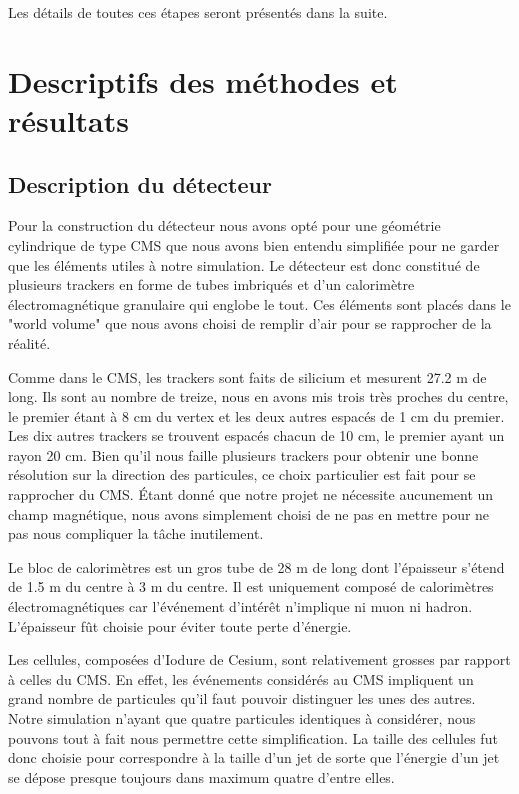 \documentclass[11pt]{article}
\begin{document}
Les d\'etails de toutes ces \'etapes seront pr\'esent\'es dans la suite.





		    \section{Descriptifs des méthodes et résultats}

\subsection{Description du détecteur}

Pour la construction du détecteur nous avons opté pour une géométrie cylindrique
de type CMS que nous avons bien entendu simplifiée pour ne garder que les
éléments utiles à notre simulation. Le détecteur est donc constitué de plusieurs
trackers en forme de tubes imbriqués et d'un calorimètre
électromagnétique granulaire qui englobe le tout. Ces éléments sont placés dans
le "world volume" que nous avons choisi de remplir d'air pour se rapprocher de
la réalité.

Comme dans le CMS, les trackers sont faits de silicium et mesurent 27.2 m de
long. Ils sont au nombre de treize, nous en avons mis trois très proches du
centre, le premier étant à 8 cm du vertex et les deux autres espacés de 1 cm du
premier. Les dix autres trackers se trouvent espacés chacun de 10 cm, le premier
ayant un rayon 20 cm. Bien qu'il nous faille plusieurs trackers pour obtenir
une bonne résolution sur la direction des particules, ce choix particulier est
fait pour se rapprocher du CMS. Étant donné que notre projet ne nécessite
aucunement un champ magnétique, nous avons simplement choisi de ne pas en
mettre pour ne pas nous compliquer la tâche inutilement. 

Le bloc de calorimètres est un gros tube de 28 m de long dont
l'épaisseur s'étend de 1.5 m du centre à 3 m du centre. Il est uniquement
composé de calorimètres électromagnétiques car l'événement d'intérêt n'implique
ni muon ni hadron. L'épaisseur fût choisie pour éviter toute perte d'énergie.

Les cellules, composées d'Iodure de Cesium, sont relativement grosses par
rapport à celles du CMS. En effet, les événements considérés au CMS impliquent
un grand nombre de particules qu'il faut pouvoir distinguer les unes des
autres. Notre simulation n'ayant que quatre particules identiques à considérer,
nous pouvons tout à fait nous permettre cette simplification. La taille des
cellules fut donc choisie pour correspondre à la taille d'un jet de sorte que
l'énergie d'un jet se dépose presque toujours dans maximum quatre d'entre elles.
\end{document}

